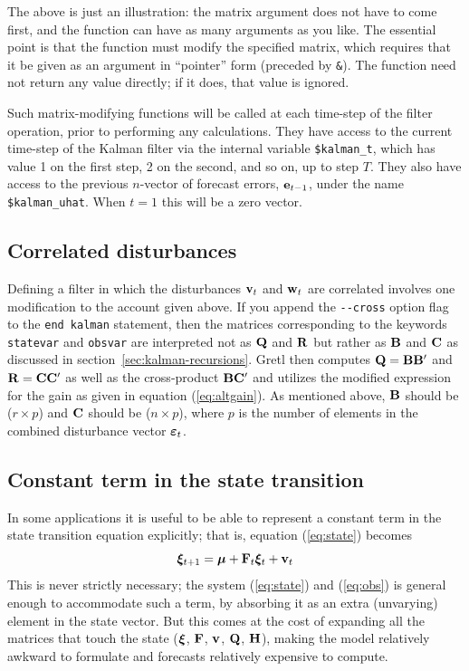 The above is just an illustration: the matrix argument does not have
to come first, and the function can have as many arguments as you
like.  The essential point is that the function must modify the
specified matrix, which requires that it be given as an argument in
``pointer'' form (preceded by \verb|&|).  The function need not return
any value directly; if it does, that value is ignored.

Such matrix-modifying functions will be called at each time-step of
the filter operation, prior to performing any calculations.  They have
access to the current time-step of the Kalman filter via the internal
variable \verb+$kalman_t+, which has value 1 on the first step, 2 on
the second, and so on, up to step $T$.  They also have access to the
previous $n$-vector of forecast errors, $\mathbf{e}_{t-1}$, under the
name \verb+$kalman_uhat+.  When $t=1$ this will be a zero vector.

\subsection{Correlated disturbances}

Defining a filter in which the disturbances $\mathbf{v}_t$ and
$\mathbf{w}_t$ are correlated involves one modification to the account
given above.  If you append the \verb|--cross| option flag to the
\texttt{end kalman} statement, then the matrices corresponding to
the keywords \texttt{statevar} and \texttt{obsvar} are interpreted
not as $\mathbf{Q}$ and $\mathbf{R}$ but rather as $\mathbf{B}$ and
$\mathbf{C}$ as discussed in section~\ref{sec:kalman-recursions}.
Gretl then computes $\mathbf{Q} = \mathbf{B}\mathbf{B}'$ and
$\mathbf{R} = \mathbf{C}\mathbf{C}'$ as well as the cross-product
$\mathbf{B}\mathbf{C}'$ and utilizes the modified expression for
the gain as given in equation (\ref{eq:altgain}).  As mentioned
above, $\mathbf{B}$ should be ($r \times p$) and $\mathbf{C}$
should be ($n \times p$), where $p$ is the number of elements
in the combined disturbance vector $\bm{\varepsilon}_t$.

\subsection{Constant term in the state transition}

In some applications it is useful to be able to represent a constant
term in the state transition equation explicitly; that is, equation
(\ref{eq:state}) becomes
%
\begin{equation}
\label{eq:statemu}
\bm{\xi}_{t+1} =  \bm{\mu} + \mathbf{F}_t \bm{\xi}_t + \mathbf{v}_t
\end{equation}
%
This is never strictly necessary; the system (\ref{eq:state}) and
(\ref{eq:obs}) is general enough to accommodate such a term, by
absorbing it as an extra (unvarying) element in the state vector. But
this comes at the cost of expanding all the matrices that touch the
state ($\bm{\xi}$, $\mathbf{F}$, $\mathbf{v}$, $\mathbf{Q}$, $\mathbf{H}$),
making the model relatively awkward to formulate and forecasts
relatively expensive to compute.

